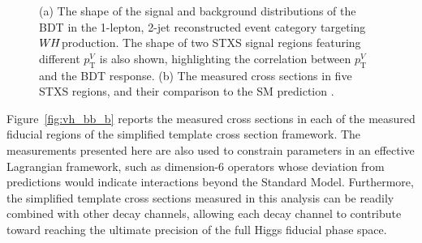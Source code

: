 \documentclass{moriond}
\def\wh{\texorpdfstring{\ensuremath{W\kern -0.1em H}\xspace}{WH\xspace}}
\begin{document}
\begin{figure}[!htbp]
  \centering
  \caption{
    (a) The shape of the signal and background  distributions of the BDT in the 1-lepton, 2-jet
    reconstructed event category targeting \wh production. The shape of two STXS signal regions
    featuring different $p^{V}_\mathrm{T}$ is also shown, highlighting the correlation between
    $p^{V}_\mathrm{T}$ and the BDT response.
    (b) The measured cross sections in five STXS regions, and their comparison to the SM prediction  \cite{Aaboud:2019nan}.
  }
  \label{fig:vh_bb}
\end{figure}

Figure~\ref{fig:vh_bb_b} reports the measured cross sections in each of the measured fiducial regions
of the simplified template cross section framework. The measurements presented here are also used
to constrain parameters in an effective Lagrangian framework, such as dimension-6 operators whose
deviation from predictions would indicate interactions beyond the Standard Model. Furthermore, the
simplified template cross sections measured in this analysis can be readily combined with other
decay channels, allowing each decay channel to contribute toward reaching the ultimate precision of
the full Higgs fiducial phase space.
\end{document}
